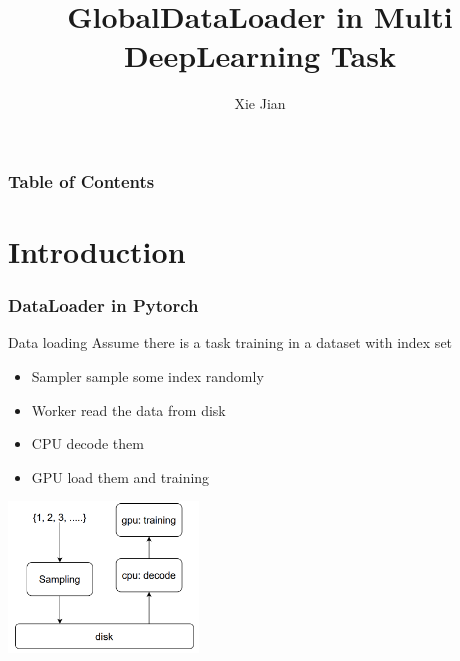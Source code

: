 \documentclass[notheorems, aspectratio=54]{beamer}
\title[GlobalDataLoader in Multi DeepLearning Task]{GlobalDataLoader in Multi DeepLearning Task}
\author{Xie Jian}
\institute[]{I2EC, ICS, NJU}
\begin{document}
\begin{frame}
    \titlepage
\end{frame}


\begin{frame}
    \frametitle{Table of Contents}
    \tableofcontents
\end{frame}

\section{Introduction}
\begin{frame}
    \frametitle{DataLoader in Pytorch}
    \begin{block}{Data loading}
        Assume there is a task training in a dataset with index set
        \begin{itemize}
            \item Sampler sample some index randomly
            \item Worker read the data from disk
            \item CPU decode them
            \item GPU load them and training
        \end{itemize}
    \end{block}
    \begin{center}
        \includegraphics[height=4cm]{global_img_dir/data_pipeline.png}
    \end{center}
\end{frame}
\end{document}
